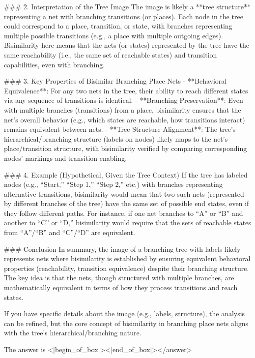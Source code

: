 ### 2. Interpretation of the Tree Image  
The image is likely a **tree structure** representing a net with branching transitions (or places). Each node in the tree could correspond to a place, transition, or state, with branches representing multiple possible transitions (e.g., a place with multiple outgoing edges). Bisimilarity here means that the nets (or states) represented by the tree have the same reachability (i.e., the same set of reachable states) and transition capabilities, even with branching.  


### 3. Key Properties of Bisimilar Branching Place Nets  
- **Behavioral Equivalence**: For any two nets in the tree, their ability to reach different states via any sequence of transitions is identical.  
- **Branching Preservation**: Even with multiple branches (transitions) from a place, bisimilarity ensures that the net’s overall behavior (e.g., which states are reachable, how transitions interact) remains equivalent between nets.  
- **Tree Structure Alignment**: The tree’s hierarchical/branching structure (labels on nodes) likely maps to the net’s place/transition structure, with bisimilarity verified by comparing corresponding nodes’ markings and transition enabling.  


### 4. Example (Hypothetical, Given the Tree Context)  
If the tree has labeled nodes (e.g., “Start,” “Step 1,” “Step 2,” etc.) with branches representing alternative transitions, bisimilarity would mean that two such nets (represented by different branches of the tree) have the same set of possible end states, even if they follow different paths. For instance, if one net branches to “A” or “B” and another to “C” or “D,” bisimilarity would require that the sets of reachable states from “A”/“B” and “C”/“D” are equivalent.  


### Conclusion  
In summary, the image of a branching tree with labels likely represents nets where bisimilarity is established by ensuring equivalent behavioral properties (reachability, transition equivalence) despite their branching structure. The key idea is that the nets, though structured with multiple branches, are mathematically equivalent in terms of how they process transitions and reach states.  

If you have specific details about the image (e.g., labels, structure), the analysis can be refined, but the core concept of bisimilarity in branching place nets aligns with the tree’s hierarchical/branching nature.  

The answer is <|begin_of_box|><|end_of_box|></answer>